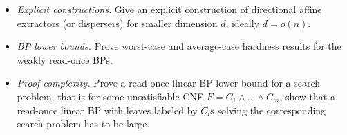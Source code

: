 \documentclass[a4paper,11pt,draft]{article}
\theoremstyle{definition}
\theoremstyle{remark}
\newcommand{\wreadonce}{weakly read-once}
\newcommand{\readonce}{read-once}
\begin{document}
\begin{itemize}
    \item \emph{Explicit constructions.} Give an explicit construction of directional affine extractors (or dispersers) for smaller dimension $d$, ideally $d = o(n)$.

    \item \emph{BP lower bounds.} Prove worst-case and average-case hardness results for the \wreadonce{} BPs.

    \item \emph{Proof complexity.} Prove a \readonce{} linear BP lower bound for a search problem, that is for some unsatisfiable CNF $F = C_1 \wedge \ldots \wedge C_m$, show that a \readonce{} linear BP with leaves labeled by $C_i$s solving the corresponding search problem has to be large.
\end{itemize}


%

%
%
%

%
%
%

%

%

%
%
%

%
%

%

%

%
%
%
%

%

%
%
%
%
%

%
%
%
%
%
%
%

%







%
%
%
%
%
%
%
%
%
%
%

%


\end{document}
